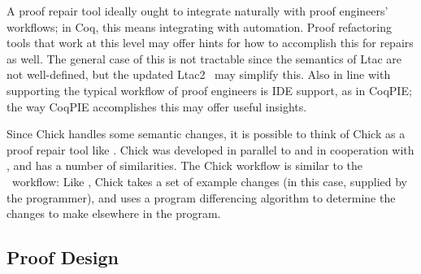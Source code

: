 A proof repair tool ideally ought to integrate naturally with proof engineers' workflows;
in Coq, this means integrating with automation.
Proof refactoring tools that work at this level may offer hints for how to accomplish this for repairs as well.
The general case of this is not tractable since the semantics of Ltac are not well-defined,
but the updated Ltac2~\cite{ltac2}
may simplify this.
Also in line with supporting the typical workflow of proof engineers is IDE support,
as in CoqPIE; the way CoqPIE accomplishes this %
may offer useful insights.

Since Chick handles some semantic changes, it is possible to think of Chick as a proof repair tool like \sysname.
Chick was developed in parallel to and in cooperation with \sysname, and has a number of similarities.
The Chick workflow is similar to the \sysname\ workflow:
Like \sysname, Chick takes a set of example changes (in this case, supplied by the programmer),
and uses a program differencing algorithm to determine the changes to make elsewhere in the program.

\iffalse
Chick also has some clear differences from \sysname, aside from operating over the Chick language instead of Gallina itself.
Unlike early versions of \sysname, Chick also applies the changes it finds to derive the new program.
However, Chick does this using a syntactic algorithm that handles simple transformations and does
not provide guarantees on the output; for some changes to inductive types, for example, not all proofs from
the old program are preserved in the new program, and the algorithm may fail %
on this class of changes. \devoid\ focuses on applying these changes for a class of changes like this
with semantic guarantess. %
It may be possible to integrate the techniques from Chick, \sysname, and \devoid\
into the same tool and use them to advance the state of proof repair.
\fi

\subsection*{Proof Design}


